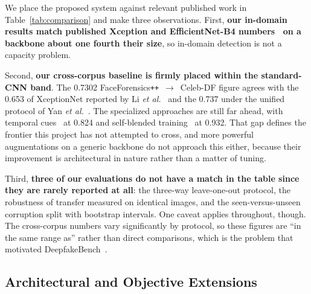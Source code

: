 \documentclass[journal,onecolumn]{IEEEtran}
\newcommand{\celebdf}{Celeb-DF}
\newcommand{\best}[1]{\textbf{#1}}
\begin{document}
We place the proposed system against relevant published work in Table~\ref{tab:comparison} and make three observations. First, \textbf{our in-domain results match published Xception and EfficientNet-B4 numbers~\cite{chollet2017xception,zhao2021multiattentional} on a backbone about one fourth their size}, so in-domain detection is not a capacity problem.

Second, \textbf{our cross-corpus baseline is firmly placed within the standard-CNN band}. The 0.7302 FaceForensics\texttt{++}~$\rightarrow$~\celebdf{} figure agrees with the 0.653 of XceptionNet reported by Li \textit{et al.}~\cite{li2020celebdf} and the 0.737 under the unified protocol of Yan \textit{et al.}~\cite{yan2023deepfakebench}. The specialized approaches are still far ahead, with temporal cues~\cite{haliassos2021lips} at 0.824 and self-blended training~\cite{shiohara2022sbi} at 0.932. That gap defines the frontier this project has not attempted to cross, and more powerful augmentations on a generic backbone do not approach this either, because their improvement is architectural in nature rather than a matter of tuning.

Third, \textbf{three of our evaluations do not have a match in the table since they are rarely reported at all}: the three-way leave-one-out protocol, the robustness of transfer measured on identical images, and the seen-versus-unseen corruption split with bootstrap intervals. One caveat applies throughout, though. The cross-corpus numbers vary significantly by protocol, so these figures are ``in the same range as'' rather than direct comparisons, which is the problem that motivated DeepfakeBench~\cite{yan2023deepfakebench}.

\subsection{Architectural and Objective Extensions}
\label{ssec:extensions}

\newcommand{\caCeleb}{0.7853}       \newcommand{\caFF}{0.8570}
\newcommand{\caDFDC}{0.7362}        \newcommand{\caMean}{0.7928}

\newcommand{\dsCeleb}{\best{0.8143}} \newcommand{\dsFF}{\best{0.8788}}
\newcommand{\dsDFDC}{0.7491}         \newcommand{\dsMean}{\best{0.8141}}
\newcommand{\daCeleb}{0.7394}        \newcommand{\daFF}{0.8665}
\newcommand{\daDFDC}{0.6980}         \newcommand{\daMean}{0.7680}

\newcommand{\ldmPairs}{137}
\newcommand{\ldmSingleRange}{0.329--0.571} \newcommand{\ldmSingleMed}{0.359}
\newcommand{\ldmLooRange}{0.428--0.586}    \newcommand{\ldmLooMed}{0.497}
\newcommand{\ldmHeavyRange}{0.423--0.560}  \newcommand{\ldmHeavyMed}{0.480}
\newcommand{\ldmAllRange}{0.329--0.586}    \newcommand{\ldmMedian}{0.480}
\end{document}
